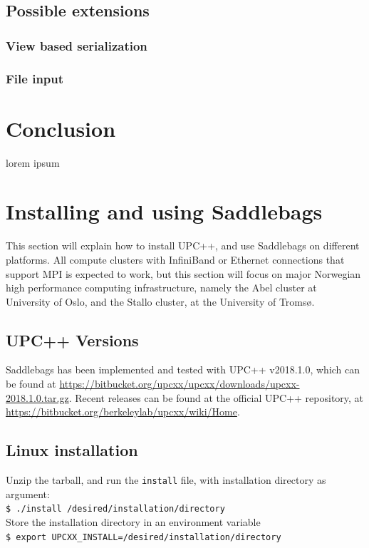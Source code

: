 \documentclass{uit-report}
\begin{document}

\section{Possible extensions}
\subsection{View based serialization}
\subsection{File input}



\chapter{Conclusion}
lorem ipsum

\pagebreak



\appendix
\chapter{Installing and using Saddlebags}
This section will explain how to install UPC++, and use Saddlebags on different platforms. All compute clusters with InfiniBand or Ethernet connections that support MPI is expected to work, but this section will focus on major Norwegian high performance computing infrastructure, namely the Abel cluster at University of Oslo, and the Stallo cluster, at the University of Tromsø. 

\section{UPC++ Versions}
Saddlebags has been implemented and tested with UPC++ v2018.1.0, which can be found at {\url{https://bitbucket.org/upcxx/upcxx/downloads/upcxx-2018.1.0.tar.gz}}. Recent releases can be found at the official UPC++ repository, at {\url{https://bitbucket.org/berkeleylab/upcxx/wiki/Home}}. 
\section{Linux installation}
Unzip the tarball, and run the \texttt{install} file, with installation directory as argument:\\
\phantom{11111} \texttt{\$ ./install /desired/installation/directory}\\
Store the installation directory in an environment variable\\
\phantom{11111} \texttt{\$ export UPCXX\_INSTALL=/desired/installation/directory}\\
\end{document}
